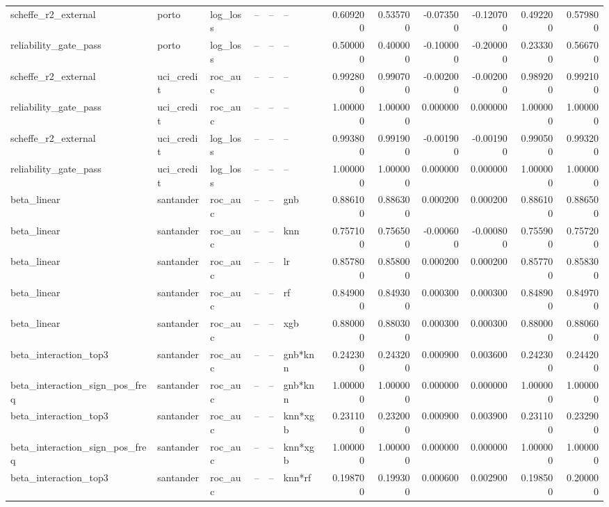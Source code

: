 \begin{landscape}
\begin{longtable}{llllllrrrrrr}
scheffe\_r2\_external & porto & log\_loss & -- & -- & -- & 0.609200 & 0.535700 & -0.073500 & -0.120700 & 0.492200 & 0.579800 \\
reliability\_gate\_pass & porto & log\_loss & -- & -- & -- & 0.500000 & 0.400000 & -0.100000 & -0.200000 & 0.233300 & 0.566700 \\
scheffe\_r2\_external & uci\_credit & roc\_auc & -- & -- & -- & 0.992800 & 0.990700 & -0.002000 & -0.002000 & 0.989200 & 0.992100 \\
reliability\_gate\_pass & uci\_credit & roc\_auc & -- & -- & -- & 1.000000 & 1.000000 & 0.000000 & 0.000000 & 1.000000 & 1.000000 \\
scheffe\_r2\_external & uci\_credit & log\_loss & -- & -- & -- & 0.993800 & 0.991900 & -0.001900 & -0.001900 & 0.990500 & 0.993200 \\
reliability\_gate\_pass & uci\_credit & log\_loss & -- & -- & -- & 1.000000 & 1.000000 & 0.000000 & 0.000000 & 1.000000 & 1.000000 \\
beta\_linear & santander & roc\_auc & -- & -- & gnb & 0.886100 & 0.886300 & 0.000200 & 0.000200 & 0.886100 & 0.886500 \\
beta\_linear & santander & roc\_auc & -- & -- & knn & 0.757100 & 0.756500 & -0.000600 & -0.000800 & 0.755900 & 0.757200 \\
beta\_linear & santander & roc\_auc & -- & -- & lr & 0.857800 & 0.858000 & 0.000200 & 0.000200 & 0.857700 & 0.858300 \\
beta\_linear & santander & roc\_auc & -- & -- & rf & 0.849000 & 0.849300 & 0.000300 & 0.000300 & 0.848900 & 0.849700 \\
beta\_linear & santander & roc\_auc & -- & -- & xgb & 0.880000 & 0.880300 & 0.000300 & 0.000300 & 0.880000 & 0.880600 \\
beta\_interaction\_top3 & santander & roc\_auc & -- & -- & gnb*knn & 0.242300 & 0.243200 & 0.000900 & 0.003600 & 0.242300 & 0.244200 \\
beta\_interaction\_sign\_pos\_freq & santander & roc\_auc & -- & -- & gnb*knn & 1.000000 & 1.000000 & 0.000000 & 0.000000 & 1.000000 & 1.000000 \\
beta\_interaction\_top3 & santander & roc\_auc & -- & -- & knn*xgb & 0.231100 & 0.232000 & 0.000900 & 0.003900 & 0.231100 & 0.232900 \\
beta\_interaction\_sign\_pos\_freq & santander & roc\_auc & -- & -- & knn*xgb & 1.000000 & 1.000000 & 0.000000 & 0.000000 & 1.000000 & 1.000000 \\
beta\_interaction\_top3 & santander & roc\_auc & -- & -- & knn*rf & 0.198700 & 0.199300 & 0.000600 & 0.002900 & 0.198500 & 0.200000 \\

\end{longtable}
\end{landscape}
